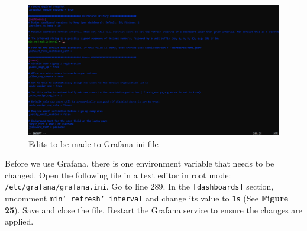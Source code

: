 \documentclass[12pt, letterpaper]{article}
\begin{document}
{{{{{{{{{{\begin{figure}[h!]
	\centering
	\includegraphics[width=1\columnwidth]{assets/ini.png}
	\caption{Edits to be made to Grafana ini file}
	\end{figure}		
	
	\newpage
		\par Before we use Grafana, there is one environment variable that needs to be changed.
	 Open the following file in a text editor in root mode: \texttt{/etc/grafana/grafana.ini}. Go to line 289. In the \texttt{[dashboards]} section, uncomment \texttt{min\char`_refresh\char`_interval} and change its  value to \texttt{1s} (See \textbf{Figure 25}). Save and close the file. Restart the Grafana service to ensure the changes are applied. 
\\[0.25\baselineskip]
	\par{} 
\\[0.25\baselineskip]
	
}}}}}}}}}}
\end{document}
